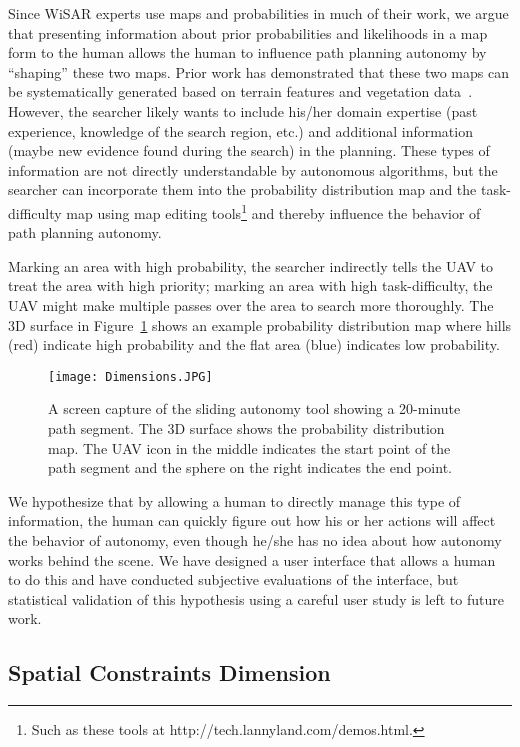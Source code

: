 Since WiSAR experts use maps and probabilities in much of their work, we argue that presenting information about prior probabilities and likelihoods in a map form to the human allows the human to influence path planning autonomy by ``shaping'' these two maps. Prior work has demonstrated that these two maps can be systematically generated based on terrain features and vegetation data~\cite{Lin2010Bayesian, Lin2014Hierarchical}. However, the searcher likely wants to include his/her domain expertise (past experience, knowledge of the search region, etc.) and additional information (maybe new evidence found during the search) in the planning. These types of information are not directly understandable by autonomous algorithms, but the searcher can incorporate them into the probability distribution map and the task-difficulty map using map editing tools\footnote{Such as these tools at http://tech.lannyland.com/demos.html.} and thereby influence the behavior of path planning autonomy.

Marking an area with high probability, the searcher indirectly tells the UAV to treat the area with high priority; marking an area with high task-difficulty, the UAV might make multiple passes over the area to search more thoroughly. The 3D surface in Figure~\ref{dimensions6} shows an example probability distribution map where hills (red) indicate high probability and the flat area (blue) indicates low probability.

\begin{figure}
\centering
\texttt{[image: Dimensions.JPG]}
\caption{A screen capture of the sliding autonomy tool showing a 20-minute path segment. The 3D surface shows the probability distribution map. The UAV icon in the middle indicates the start point of the path segment and the sphere on the right indicates the end point.}
\label{dimensions6}
\end{figure}

We hypothesize that by allowing a human to directly manage this type of information, the human can quickly figure out how his or her actions will affect the behavior of autonomy, even though he/she has no idea about how autonomy works behind the scene. We have designed a user interface that allows a human to do this and have conducted subjective evaluations of the interface, but statistical validation of this hypothesis using a careful user study is left to future work.

\subsection{Spatial Constraints Dimension}

